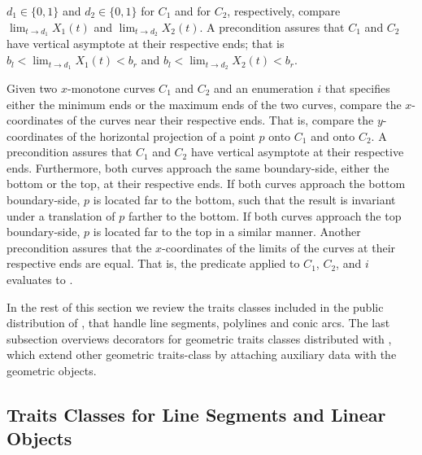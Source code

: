 \begin{description}
    $d_1\in \{0,1\}$ and $d_2 \in \{0,1\}$ for $C_1$ and for $C_2$,
    respectively, compare $\lim_{t \rightarrow d_1} X_1(t)$ and
    $\lim_{t \rightarrow d_2} X_2(t)$. A precondition assures that $C_1$
    and $C_2$ have vertical asymptote at their respective ends;
    that is $b_l < \lim_{t \rightarrow d_1} X_1(t) < b_r$ and
    $b_l < \lim_{t \rightarrow d_2} X_2(t)< b_r$.
%
\item[\ccc{Compare_x_near_limit_2}:]
  Given two $x$-monotone curves $C_1$ and $C_2$ and an enumeration $i$
  that specifies either the minimum ends or the maximum ends of the
  two curves, compare the $x$-coordinates of the curves near their
  respective ends. That is, compare the $y$-coordinates of the
  horizontal projection of a point $p$ onto $C_1$ and onto $C_2$.
  A precondition assures that $C_1$ and $C_2$ have vertical asymptote
  at their respective ends. Furthermore, both curves approach the same
  boundary-side, either the bottom or the top, at their respective
  ends. If both curves approach the bottom boundary-side, $p$ is
  located far to the bottom, such that the result is invariant under a
  translation of $p$ farther to the bottom. If both curves approach
  the top boundary-side, $p$ is located far to the top in a similar
  manner. Another precondition assures that the $x$-coordinates of the
  limits of the curves at their respective ends are equal. That is,
  the predicate  applied to $C_1$, $C_2$,
  and $i$ evaluates to .
\end{description}
\lcTex{\color{black}}

In the rest of this section we review the traits classes
included in the public distribution of \cgal, that handle line
segments, polylines and conic arcs. The last subsection overviews
decorators for geometric traits classes distributed with \cgal,
which extend other geometric traits-class by attaching auxiliary
data with the geometric objects.

\subsection{Traits Classes for Line Segments and Linear Objects
\label{arr_ssec:tr_segs}}

